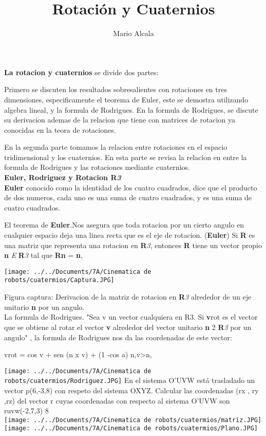 \documentclass[letter,12pt]{report}
\author{Mario Alcala}
\title{Rotaci\'on y Cuaternios}
\begin{document}
\maketitle

 \textbf{La rotacion y cuaternios} se divide dos partes:
 
Primero se discuten los resultados sobresalientes con rotaciones en tres
dimensiones, especificamente el teorema de Euler, este se demostra utilizando algebra lineal, y la formula de Rodrigues. En la formula de Rodrigues, se discute su derivacion ademas de la relacion que tiene con matrices de rotacion ya 
conocidas en la teora de rotaciones.

En la segunda parte tomamos la relacion entre rotaciones en el
espacio tridimensional y los cuaternios. En esta parte se revisa la relacion en entre la formula de Rodrigues y las rotaciones mediante cuaternios.\\

\textbf{Euler, Rodriguez y Rotacion R\emph{3}}\\


\textbf{Euler} conocido como la identidad de los cuatro cuadrados, dice que el producto de dos
numeros, cada uno es una suma de cuatro cuadrados, y es una
suma de cuatro cuadrados.

El teorema de \textbf{Euler}.Nos asegura que toda rotacion por un cierto angulo en cualquier espacio deja una linea recta que es el eje de rotacion.
(\textbf{Euler}) Si \textbf{R} es una matriz que representa una rotacion en \textbf{R}\textit{3}, entonces \textbf{R} tiene un vector propio \textbf{n} \textit{E} \textbf{R}\textit{3} tal que
\textbf{Rn} = \textbf{n},

\texttt{[image: ../../Documents/7A/Cinematica de robots/cuatermios/Captura.JPG]}

Figura captura: Derivacion de la matriz de rotacion en \textbf{R}\textit{3} alrededor de un eje unitario \textbf{n} por un angulo.\\

La formula de Rodrigues.
"Sea v un vector cualquiera en R3. Si \textbf{v}rot es el vector que se obtiene al rotar el
vector \textbf{v} alrededor del vector unitario \textbf{n} 2 \textbf{R}\textit{3} por un angulo" , la formula
de Rodrigues nos da las coordenadas de este vector:\\

\begin{center}
vrot = cos v + sen  (n x v) + (1 -cos a) \<n,v>n,
\end{center}

\texttt{[image: ../../Documents/7A/Cinematica de robots/cuatermios/Rodriguez.JPG]} 
En el sistema O'UVW está trasladado un vector p(6,-3,8) con respeto del sistema OXYZ. Calcular las coordenadas (rx , ry ,rz) del vector r cuyas coordenadas con respecto al sistema O'UVW son ruvw(-2,7,3) 8\\
\texttt{[image: ../../Documents/7A/Cinematica de robots/cuatermios/matriz.JPG]} \\
\texttt{[image: ../../Documents/7A/Cinematica de robots/cuatermios/Plano.JPG]} 
\end{document}
